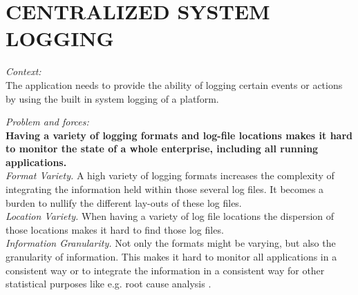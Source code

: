 \newpage
\section*{CENTRALIZED SYSTEM LOGGING}



\textit{Context:}\\
The application needs to provide the ability of logging certain events or actions 
by using the built in system logging of a platform. 

\begin{center}
  
\end{center}

\textit{Problem and forces:\\}
\textbf{Having a variety of logging formats and log-file locations makes it hard to monitor the state of a whole enterprise, including all running applications.}\\

\textit{Format Variety.} A high variety of logging formats increases the complexity of integrating the information held within those several log files. It becomes a burden to nullify
the different lay-outs of these log files.\\ 

\textit{Location Variety.} When having a variety of log file locations the dispersion of those locations makes it hard to find those log files.\\

\textit{Information Granularity.} Not only the formats might be varying, but also the granularity of information. This makes it hard to monitor all applications in a consistent way or to integrate the information in a consistent way for other statistical purposes like e.g. root cause analysis \cite{conf/mkwi/PaschkeS06}.

